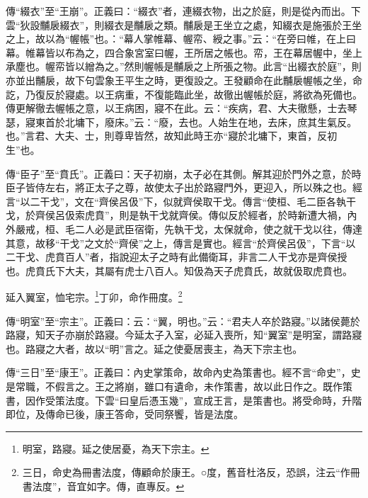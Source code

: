 {\noindent\zhuan{}\fzbyks 傳“綴衣”至“王崩”。正義曰：“綴衣”者，連綴衣物，出之於庭，則是從內而出。下雲“狄設黼扆綴衣”，則綴衣是黼扆之類。黼扆是王坐立之處，知綴衣是施張於王坐之上，故以為“幄帳”也。：“幕人掌帷幕、幄帟、綬之事。”云：“在旁曰帷，在上曰幕。帷幕皆以布為之，四合象宮室曰幄，王所居之帳也。帟，王在幕居幄中，坐上承塵也。幄帟皆以繒為之。”然則幄帳是黼扆之上所張之物。此言“出綴衣於庭”，則亦並出黼扆，故下句雲象王平生之時，更復設之。王發顧命在此黼扆幄帳之坐，命訖，乃復反於寢處。以王病重，不復能臨此坐，故徹出幄帳於庭，將欲為死備也。傳更解徹去幄帳之意，以王病困，寢不在此。云：“疾病，君、大夫徹懸，士去琴瑟，寢東首於北墉下，廢床。”云：“廢，去也。人始生在地，去床，庶其生氣反。也。”言君、大夫、士，則尊卑皆然，故知此時王亦“寢於北墉下，東首，反初生”也。 \par}

{\noindent\zhuan{}\fzbyks 傳“臣子”至“賁氏”。正義曰：天子初崩，太子必在其側。解其迎於門外之意，於時臣子皆侍左右，將正太子之尊，故使太子出於路寢門外，更迎入，所以殊之也。經言“以二干戈”，文在“齊侯呂伋”下，似就齊侯取干戈。傳言“使桓、毛二臣各執干戈，於齊侯呂伋索虎賁”，則是執干戈就齊侯。傳似反於經者，於時新遭大禍，內外嚴戒，桓、毛二人必是武臣宿衛，先執干戈，太保就命，使之就干戈以往，傳達其意，故移“干戈”之文於“齊侯”之上，傳言是實也。經言“於齊侯呂伋”，下言“以二干戈、虎賁百人”者，指說迎太子之時有此備衛耳，非言二人干戈亦是齊侯授也。虎賁氏下大夫，其屬有虎士八百人。知伋為天子虎賁氏，故就伋取虎賁也。 \par}

延入翼室，恤宅宗。\footnote{明室，路寢。延之使居憂，為天下宗主。}丁卯，命作冊度。\footnote{三日，命史為冊書法度，傳顧命於康王。○度，舊音杜洛反，恐誤，注云“作冊書法度”，音宜如字。傳，直專反。}

{\noindent\zhuan{}\fzbyks 傳“明室”至“宗主”。正義曰：云：“翼，明也。”云：“君夫人卒於路寢。”以諸侯薨於路寢，知天子亦崩於路寢。今延太子入室，必延入喪所，知“翼室”是明室，謂路寢也。路寢之大者，故以“明”言之。延之使憂居喪主，為天下宗主也。 \par}

{\noindent\zhuan{}\fzbyks 傳“三日”至“康王”。正義曰：內史掌策命，故命內史為策書也。經不言“命史”，史是常職，不假言之。王之將崩，雖口有遺命，未作策書，故以此日作之。既作策書，因作受策法度。下雲“曰皇后憑玉幾”，宣成王言，是策書也。將受命時，升階即位，及傳命已後，康王答命，受同祭饗，皆是法度。 \par}

